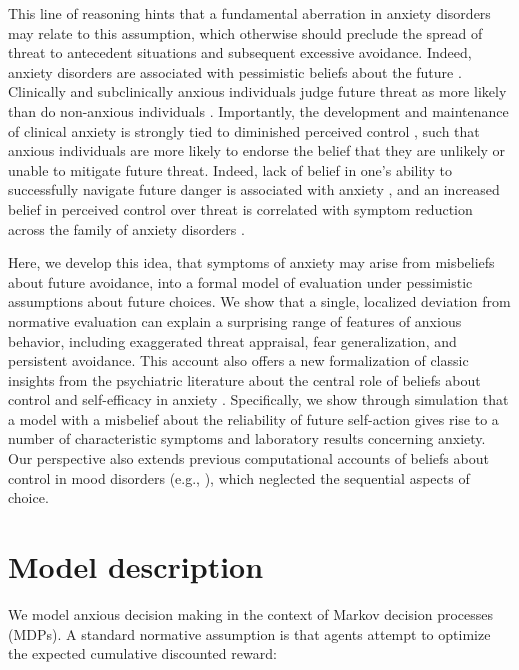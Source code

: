 \documentclass[manuscript]{stjour}
\begin{document}
This line of reasoning hints that a fundamental aberration in anxiety disorders may relate to this assumption, which otherwise should preclude the spread of threat to antecedent situations and subsequent excessive avoidance. Indeed, anxiety disorders are associated with pessimistic beliefs about the future \citep{ClarkBeck2011}. Clinically and subclinically anxious individuals judge future threat as more likely than do non-anxious individuals \citep{ButlerMathews1983, ButlerMathews1987, MacleodByrne1996}. Importantly, the development and maintenance of clinical anxiety is strongly tied to diminished perceived control \citep{bandura1977, barlow2002, gallagher2014a}, such that anxious individuals are more likely to endorse the belief that they are unlikely or unable to mitigate future threat. Indeed, lack of belief in one's ability to successfully navigate future danger is associated with anxiety \citep{davey1996, dugas1997}, and an increased belief in perceived control over threat is correlated with symptom reduction across the family of anxiety disorders \citep{gallagher2014b}. 

Here, we develop this idea, that symptoms of anxiety may arise from misbeliefs about future avoidance, into a formal model of evaluation under pessimistic assumptions about future choices. We show that a single, localized deviation from normative evaluation can explain a surprising range of features of anxious behavior, including exaggerated threat appraisal, fear generalization, and persistent avoidance. This account also offers a new formalization of classic insights from the psychiatric literature about the central role of beliefs about control and self-efficacy in anxiety \citep{bandura1977, barlow2002}. Specifically, we show through simulation that a model with a misbelief about the reliability of future self-action gives rise to a number of characteristic symptoms and laboratory results concerning anxiety. Our perspective also extends previous computational accounts of beliefs about control in mood disorders (e.g., \citealp{HuysDayan2009}), which neglected the sequential aspects of choice.

\section{Model description}

We model anxious decision making in the context of Markov decision processes (MDPs). A standard normative assumption is that agents attempt to optimize the expected cumulative discounted reward:
\end{document}
